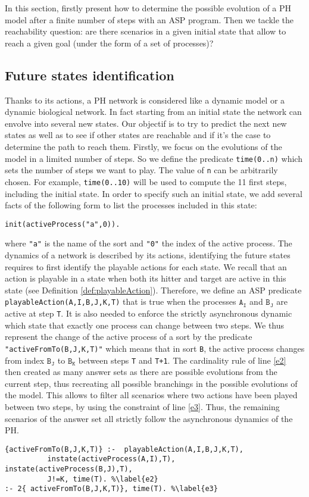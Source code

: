 
In this section, firstly present how to determine the possible evolution of a PH model after a finite number of steps with an ASP program.
Then we tackle the reachability question: are there scenarios in a given initial state
that allow to reach a given goal (under the form of a set of processes)?

\subsection{Future states identification}
Thanks to its actions, a PH network is considered like a dynamic model or a dynamic biological network. In fact starting from an initial state the network can envolve into several new states. Our objectif is to try to predict the next new states as well as to  see if other states are reachable and if it's the case to determine the path to reach them.
Firstly, we focus on the evolutions of the model in a limited number of steps.
So we define the predicate \texttt{time(0..n)} which sets the number of steps we want to play.
The value of \texttt{n} can be arbitrarily chosen.
For example, \texttt{time(0..10)} will be used to compute the 11 first steps,
including the initial state.
In order to specify such an initial state, we add several facts of the following form
to list the processes included in this state:
\begin{lstlisting}
init(activeProcess("a",0)).
\end{lstlisting}
where \texttt{"a"} is the name of the sort and \texttt{"0"} the index of the active process.
The dynamics of a network is described by its actions,
identifying the future states requires to first identify the playable actions for each state.
We recall that an action is playable in a state when both its hitter and target are active in this state (see Definition \ref{def:playableAction}).
Therefore, we define an ASP predicate \texttt{playableAction(A,I,B,J,K,T)} that is true
when the processes $\texttt{A}_\texttt{I}$ and $\texttt{B}_\texttt{J}$ are active at step \texttt{T}.
It is also needed to enforce the strictly asynchronous dynamic
which state that exactly one process can change between two steps.
We thus represent the change of the active process of a sort
by the predicate \texttt{"activeFromTo(B,J,K,T)"}
which means that in sort \texttt{B}, the active process changes from index $\texttt{B}_\texttt{J}$ to $\texttt{B}_\texttt{K}$ between steps \texttt{T} and \texttt{T+1}.
The cardinality rule of line \ref{e2} then
created as many answer sets as there are possible evolutions from the current step,
thus recreating all possible branchings in the possible evolutions of the model.
This allows to filter all scenarios where two actions have been played between
two steps, by using the constraint of line \ref{e3}.
Thus, the remaining scenarios of the answer set all strictly follow
the asynchronous dynamics of the PH.
\begin{lstlisting}
{activeFromTo(B,J,K,T)} :-  playableAction(A,I,B,J,K,T),
          instate(activeProcess(A,I),T), instate(activeProcess(B,J),T),
          J!=K, time(T). %\label{e2}
:- 2{ activeFromTo(B,J,K,T)}, time(T). %\label{e3}
\end{lstlisting}

